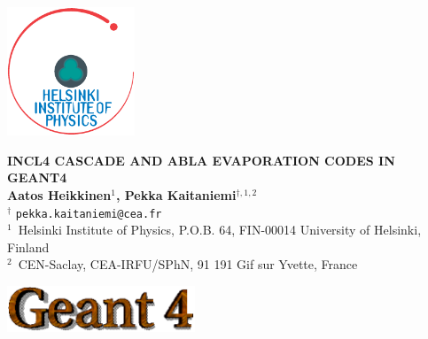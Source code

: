 \documentclass[20pt]{article}
\newlength{\bgwidth}
\newlength{\bgheight}
\begin{document}
\huge
\begin{center}



\vspace{-1in}
	\parbox[c]{1.4cm}{\includegraphics[width=3.8cm]{images/hiplogo.eps}}
	\hspace{0.6cm}
   \parbox[c]{0.8\linewidth}{
		\begin{center}
			\textbf{\Huge {\sf INCL4} CASCADE AND {\sf ABLA} EVAPORATION CODES IN {\sf GEANT4}} \\[0.5em]
			\textbf{\LARGE Aatos Heikkinen$^{1}$, Pekka Kaitaniemi$^{\dagger, 1, 2}$} \\[0.3em]
			{\Large $^{\dagger}$ {\tt pekka.kaitaniemi@cea.fr}} \\
                        {\LARGE $^1$~Helsinki Institute of Physics, P.O.B. 64, FIN-00014 University of Helsinki, Finland}\\
                        {\LARGE $^2$~CEN-Saclay, CEA-IRFU/SPhN, 91 191 Gif sur Yvette, France}
                        \vskip2cm
		\end{center}
	}
	\parbox[c]{5.3cm}{\hspace{-1.0cm} \includegraphics[width=5.6cm]{images/g4logo.eps}}


\end{center}
\end{document}
